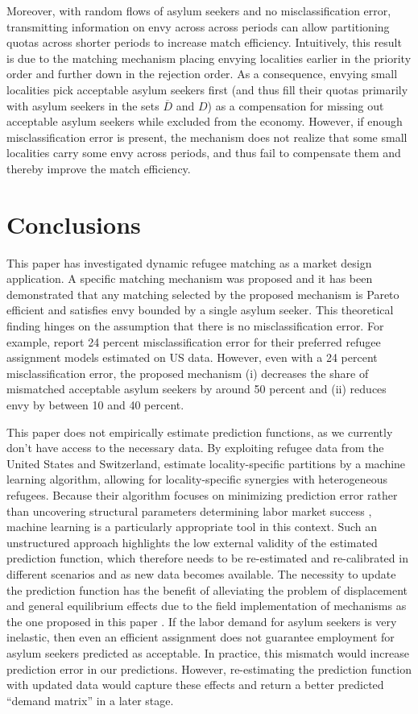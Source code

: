 \documentclass[12pt,fleqn]{article}
\begin{document}
Moreover, with random flows of asylum seekers and no misclassification error, transmitting information on envy across across periods can allow partitioning quotas across shorter periods to increase match efficiency. Intuitively, this result is due to the matching mechanism placing envying localities earlier in the priority order and further down in the rejection order. As a consequence, envying small localities pick acceptable asylum seekers first (and thus fill their quotas primarily with asylum seekers in the sets $\overline{D}$ and $D$) as a compensation for missing out acceptable asylum seekers while excluded from the economy. However, if enough misclassification error is present, the mechanism does not realize that some small localities carry some envy across periods, and thus fail to compensate them and thereby improve the match efficiency.

\section{Conclusions}\label{SEC:conclusions}
This paper has investigated dynamic refugee matching as a market design application. A specific matching mechanism was proposed and it has been demonstrated that any matching selected by the proposed mechanism is Pareto efficient and satisfies envy bounded by a single asylum seeker. This theoretical finding hinges on the assumption that there is no misclassification error. For example, \cite{bib:BansakEtAl} report 24 percent misclassification error for their preferred refugee assignment models estimated on US data. However, even with a 24 percent misclassification error, the proposed mechanism (i) decreases the share of mismatched acceptable asylum seekers by around 50 percent and (ii) reduces envy by between 10 and 40 percent.

This paper does not empirically estimate prediction functions, as we currently don't have access to the necessary data. By exploiting refugee data from the United States and Switzerland, \cite{bib:BansakEtAl} estimate locality-specific partitions by a machine learning algorithm, allowing for locality-specific synergies with heterogeneous refugees. Because their algorithm focuses on minimizing prediction error rather than uncovering structural parameters determining labor market success \citep{bib:MullainathanSpiess}, machine learning is a particularly appropriate tool in this context. Such an unstructured approach highlights the low external validity of the estimated prediction function, which therefore needs to be re-estimated and re-calibrated in different scenarios and as new data becomes available. The necessity to update the prediction function has the benefit of alleviating the problem of displacement and general equilibrium effects due to the field implementation of mechanisms as the one proposed in this paper \citep{bib:CreponEtAl}. If the labor demand for asylum seekers is very inelastic, then even an efficient assignment does not guarantee employment for asylum seekers predicted as acceptable. In practice, this mismatch would increase prediction error in our predictions. However, re-estimating the prediction function with updated data would capture these effects and return a better predicted ``demand matrix'' in a later stage.
\end{document}
